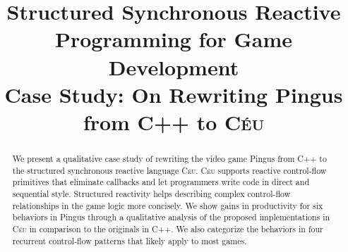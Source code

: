 \documentclass[times,twocolumn,final]{elsarticle}
\newcommand{\CEU}{\textsc{C\'{e}u}\xspace}
\begin{document}

\begin{frontmatter}

\title{Structured Synchronous Reactive Programming for Game Development
        \\ \Large{Case Study: On Rewriting Pingus from C++ to \CEU}}

\received{\today}


\begin{abstract}
We present a qualitative case study of rewriting the video game Pingus from C++
to the structured synchronous reactive language \CEU.
%
\CEU supports reactive control-flow primitives that eliminate callbacks and let
programmers write code in direct and sequential style.
Structured reactivity helps describing complex control-flow relationships in
the game logic more concisely.
%
We show gains in productivity for six behaviors in Pingus through a qualitative
analysis of the proposed implementations in \CEU in comparison to the originals
in C++.
%
We also categorize the behaviors in four recurrent control-flow patterns that
likely apply to most games.
\end{abstract}


\end{frontmatter}
\end{document}
